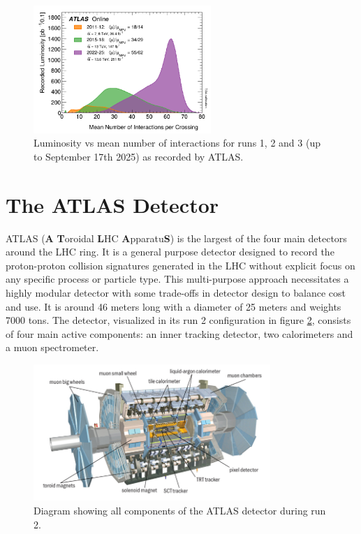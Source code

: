 \begin{figure}
\centering
    \includegraphics[width=0.6\textwidth]{images/Luminosity_vs_Pileup.png}
    \caption{Luminosity vs mean number of interactions for runs 1, 2 and 3 (up to September 17th 2025) as recorded by ATLAS.}
    \label{fig:Luminosity_vs_Pileup}
\end{figure}

\section{The ATLAS Detector}

ATLAS (\textbf{A} \textbf{T}oroidal \textbf{L}HC \textbf{A}pparatu\textbf{S}) is the largest of the four main detectors 
around the LHC ring. It is a general purpose detector designed to record the proton-proton collision signatures 
generated in the LHC without explicit focus on any specific process or particle type. This multi-purpose approach 
necessitates a highly modular detector with some trade-offs in detector design to balance cost and use. It is around 46 
meters long with a diameter of 25 meters and weights 7000 tons. The detector, visualized in its run 2 configuration in 
figure \ref{fig:ATLAS_Detector}, consists of four main active components: an inner tracking detector, two calorimeters 
and a muon spectrometer. \par

\begin{figure}[h!]
\centering
    \includegraphics[width=0.8\textwidth]{images/ATLAS_Detector.jpg}
    \caption{Diagram showing all components of the ATLAS detector during run 2.}
    \label{fig:ATLAS_Detector}
\end{figure}

